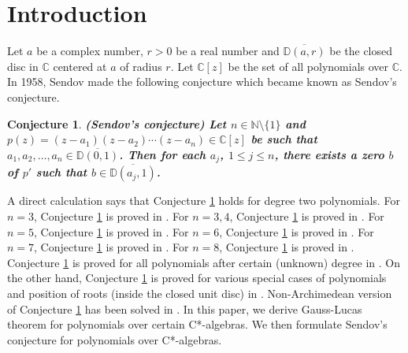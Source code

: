 \documentclass{amsart}
\newtheorem{conjecture}[theorem]{Conjecture}
\begin{document}
\section{Introduction}
Let $a$ be a complex number, $r>0$ be a real number and $\overline{\mathbb{D}(a, r)}$ be the closed disc in $\mathbb{C}$ centered at $a$ of radius $r$. Let $\mathbb{C}[z]$ be the set of all polynomials over $\mathbb{C}$. In 1958, Sendov made the following conjecture which became known as Sendov's conjecture.
 \begin{conjecture}\label{SENDOV} \cite{HAYMAN, MARDEN, RAHMANSCHMEISSERBOOK}	\textbf{(Sendov's conjecture)
 	Let $n \in \mathbb{N}\setminus \{1\}$ and $p(z)=(z-a_1)(z-a_2)\cdots (z-a_n)\in \mathbb{C}[z]$ be such that $a_1, a_2, \dots,  a_n \in \overline{\mathbb{D}(0, 1)}$. Then for each $a_j$, $1\leq j\leq n$, there exists  a zero $b$ of $p'$ such that $b \in  \overline{\mathbb{D}(a_j, 1)}$.} 
 \end{conjecture} 
   A direct calculation says that Conjecture \ref{SENDOV} holds for degree two polynomials. For $n=3$, Conjecture  \ref{SENDOV}  is proved in \cite{BRANNAN}. For $n=3,4$,  Conjecture \ref{SENDOV}  is proved in \cite{RUBINSTEIN}.   For $n=5$,  Conjecture \ref{SENDOV}  is proved in \cite{MEIRSHARMA}. For $n=6$,  Conjecture \ref{SENDOV}  is proved in \cite{KATSOPRINAKIS, BORCEA1996}. For $n=7$,  Conjecture \ref{SENDOV}  is proved in \cite{BROWN1997}. For $n=8$,  Conjecture \ref{SENDOV}  is proved in \cite{BROWNXIANG}. Conjecture \ref{SENDOV}  is proved for all polynomials after certain (unknown) degree in \cite{TAO}. On the other hand, Conjecture \ref{SENDOV}  is proved for various special cases of polynomials and position of roots (inside the closed unit disc) in \cite{BORCEA, BROWN1991, BROWN, BOJANOV, SCHMEISSER, DEGOT, CHALEBGWA, RUBINSTEIN, GOODMANRAHMANRATTI, MILLER, CHIJIWA, KASMALKAR, JOYAL, VAIJAITUZAHARESCU, MILLER2005, MILLER2008, SAFFTWOMEY, MILLER1990, BORCEA1998, RAHMANTARIQ, GOODMAN, PAWLOWSKI, MILLER1992, CHIJIWA2010, SCHMIEDERSZYNAL, DAEPPGORKINVOSS, BOJANOVRAHMANSZYNAL, BYRNE, BYRNE1997}. Non-Archimedean version of Conjecture \ref{SENDOV} has been solved in  \cite{CHOILEE}. In this paper, we derive Gauss-Lucas theorem for polynomials over certain C*-algebras. We then formulate Sendov's conjecture for polynomials over C*-algebras.
 
 
   
   
  
  
\end{document}
